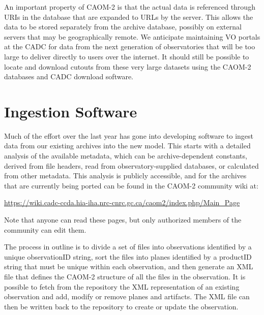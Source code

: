 An important property of CAOM-2 is that the actual data is referenced through URIs in the database that are expanded to URLs by the server.  This allows the data to be stored separately from the archive database, possibly on external servers that may be geographically remote.  We anticipate maintaining VO portals at the CADC for data from the next generation of observatories that will be too large to deliver directly to users over the internet.  It should still be possible to locate and download cutouts from these very large datasets using the CAOM-2 databases and CADC download software.

\section{Ingestion Software}
Much of the effort over the last year has gone into developing software to ingest data from our existing archives into the new model.  This starts with a detailed analysis of the available metadata, which can be archive-dependent constants, derived from file headers, read from observatory-supplied databases, or calculated from other metadata.  This analysis is publicly accessible, and for the archives that are currently being ported can be found in the CAOM-2 community wiki at: 
\begin{center}
{\small \url{https://wiki.cadc-ccda.hia-iha.nrc-cnrc.gc.ca/caom2/index.php/Main_Page}}  
\end{center}
Note that anyone can read these pages, but only authorized members of the community can edit them.  

The process in outline is to divide a set of files into observations identified by a unique observationID string, sort the files into planes identified by a productID string that must be unique within each observation, and then generate an XML file that defines the CAOM-2 structure of all the files in the observation.  It is possible to fetch from the repository the XML representation of an existing observation and add, modify or remove planes and artifacts.  The XML file can then be written back to the repository to create or update the observation.

